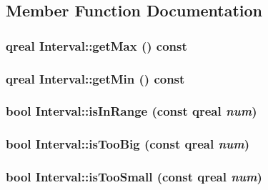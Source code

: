 \subsection{Member Function Documentation}
\hypertarget{class_robot_model_1_1_interval_a26857944f58e736ed0abdf534e2f56d8}{
\subsubsection[{getMax}]{\setlength{\rightskip}{0pt plus 5cm}qreal Interval::getMax () const}}
\label{class_robot_model_1_1_interval_a26857944f58e736ed0abdf534e2f56d8}
\hypertarget{class_robot_model_1_1_interval_abb8aac06ae73b9dfc7c3caf3f8b56399}{
\subsubsection[{getMin}]{\setlength{\rightskip}{0pt plus 5cm}qreal Interval::getMin () const}}
\label{class_robot_model_1_1_interval_abb8aac06ae73b9dfc7c3caf3f8b56399}
\hypertarget{class_robot_model_1_1_interval_a26125787902f3761e303ba3999d0eb71}{
\subsubsection[{isInRange}]{\setlength{\rightskip}{0pt plus 5cm}bool Interval::isInRange (const qreal {\em num})}}
\label{class_robot_model_1_1_interval_a26125787902f3761e303ba3999d0eb71}
\hypertarget{class_robot_model_1_1_interval_ae8da5063cbb210bdc856e30ea2b01f19}{
\subsubsection[{isTooBig}]{\setlength{\rightskip}{0pt plus 5cm}bool Interval::isTooBig (const qreal {\em num})}}
\label{class_robot_model_1_1_interval_ae8da5063cbb210bdc856e30ea2b01f19}
\hypertarget{class_robot_model_1_1_interval_a15ffb7f16e3bad02073761ecd23d9695}{
\subsubsection[{isTooSmall}]{\setlength{\rightskip}{0pt plus 5cm}bool Interval::isTooSmall (const qreal {\em num})}}
